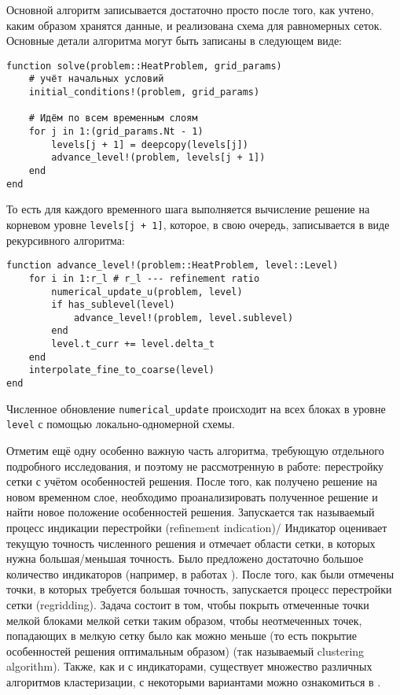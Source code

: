 Основной алгоритм записывается достаточно просто после того, как учтено, каким образом хранятся данные, и реализована схема для равномерных сеток.
Основные детали алгоритма могут быть записаны в следующем виде:
\begin{verbatim}
function solve(problem::HeatProblem, grid_params)
    # учёт начальных условий
    initial_conditions!(problem, grid_params)

    # Идём по всем временным слоям
    for j in 1:(grid_params.Nt - 1)
        levels[j + 1] = deepcopy(levels[j])
        advance_level!(problem, levels[j + 1])
    end
end
\end{verbatim}
То есть для каждого временного шага выполняется вычисление решение на корневом уровне \texttt{levels[j + 1]}, которое, в свою очередь, записывается в виде рекурсивного алгоритма:
\begin{verbatim}
function advance_level!(problem::HeatProblem, level::Level)
    for i in 1:r_l # r_l --- refinement ratio
        numerical_update_u(problem, level)
        if has_sublevel(level)
            advance_level!(problem, level.sublevel)
        end
        level.t_curr += level.delta_t
    end
    interpolate_fine_to_coarse(level)
end
\end{verbatim}
Численное обновление \texttt{numerical\_update} происходит на всех блоках в уровне \texttt{level} с помощью локально-одномерной схемы.

Отметим ещё одну особенно важную часть алгоритма, требующую отдельного подробного исследования, и поэтому не рассмотренную в работе: перестройку сетки с учётом особенностей решения.
После того, как получено решение на новом временном слое, необходимо проанализировать полученное решение и найти новое положение особенностей решения.
Запускается так называемый процесс индикации перестройки (refinement indication)/
Индикатор оценивает текущую точность численного решения и отмечает области сетки, в которых нужна большая/меньшая точность.
Было предложено достаточно большое количество индикаторов (например, в работах \cite{berger1989local, berger1982adaptive, lohner1987adaptive}).
После того, как были отмечены точки, в которых требуется большая точность, запускается процесс перестройки сетки (regridding).
Задача состоит в том, чтобы покрыть отмеченные точки мелкой блоками мелкой сетки таким образом, чтобы неотмеченных точек, попадающих в мелкую сетку было как можно меньше (то есть покрытие особенностей решения оптимальным образом) (так называемый clustering algorithm).
Также, как и с индикаторами, существует множество различных алгоритмов кластеризации, с некоторыми вариантами можно ознакомиться в \cite{berger1989local, deiterding2011block}.
